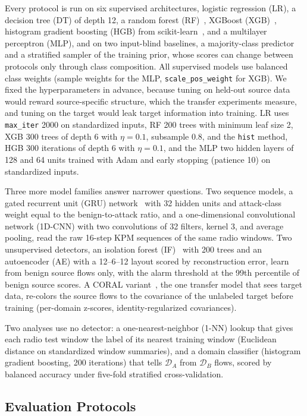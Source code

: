 \documentclass{ieeeaccess}
\newcommand{\DA}{\ensuremath{\mathcal{D}_{A}}}
\newcommand{\DB}{\ensuremath{\mathcal{D}_{B}}}
\begin{document}
Every protocol is run on six supervised architectures, logistic regression (LR), a decision tree (DT) of depth 12, a random forest (RF)~\cite{breiman2001random}, XGBoost (XGB)~\cite{chen2016xgboost}, histogram gradient boosting (HGB) from scikit-learn~\cite{pedregosa2011scikit}, and a multilayer perceptron (MLP), and on two input-blind baselines, a majority-class predictor and a stratified sampler of the training prior, whose scores can change between protocols only through class composition. All supervised models use balanced class weights (sample weights for the MLP, \texttt{scale\_pos\_weight} for XGB). We fixed the hyperparameters in advance, because tuning on held-out source data would reward source-specific structure, which the transfer experiments measure, and tuning on the target would leak target information into training. LR uses \texttt{max\_iter} 2000 on standardized inputs, RF 200 trees with minimum leaf size 2, XGB 300 trees of depth 6 with $\eta=0.1$, subsample 0.8, and the \texttt{hist} method, HGB 300 iterations of depth 6 with $\eta=0.1$, and the MLP two hidden layers of 128 and 64 units trained with Adam and early stopping (patience 10) on standardized inputs.

Three more model families answer narrower questions. Two sequence models, a gated recurrent unit (GRU) network~\cite{cho2014gru} with 32 hidden units and attack-class weight equal to the benign-to-attack ratio, and a one-dimensional convolutional network (1D-CNN) with two convolutions of 32 filters, kernel 3, and average pooling, read the raw 16-step KPM sequences of the same radio windows. Two unsupervised detectors, an isolation forest (IF)~\cite{liu2008isolation} with 200 trees and an autoencoder (AE) with a 12--6--12 layout scored by reconstruction error, learn from benign source flows only, with the alarm threshold at the 99th percentile of benign source scores. A CORAL variant~\cite{sun2016coral}, the one transfer model that sees target data, re-colors the source flows to the covariance of the unlabeled target before training (per-domain z-scores, identity-regularized covariances).

Two analyses use no detector: a one-nearest-neighbor (1-NN) lookup that gives each radio test window the label of its nearest training window (Euclidean distance on standardized window summaries), and a domain classifier (histogram gradient boosting, 200 iterations) that tells \DA{} from \DB{} flows, scored by balanced accuracy under five-fold stratified cross-validation.

\subsection{Evaluation Protocols}
\end{document}
